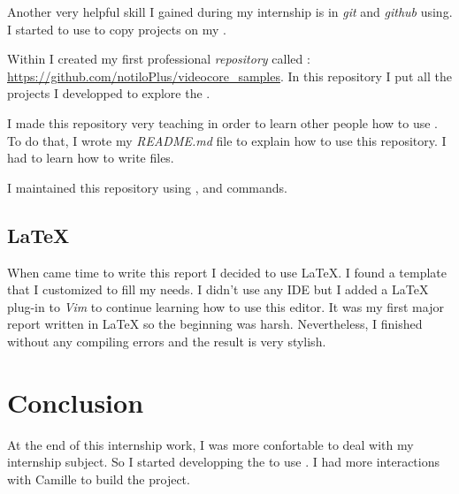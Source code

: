 Another very helpful skill I gained during my internship is in \emph{git} and \emph{github} using. I started to use  to copy projects on my \rasp.

Within \groupname{} I created my first professional \emph{repository} called : \url{https://github.com/notiloPlus/videocore_samples}. In this repository I put all the projects I developped to explore the \vc.

I made this repository very teaching in order to learn other people how to use \vc. To do that, I wrote my \emph{README.md} file to explain how to use this repository. I had to learn how to write  files.

I maintained this repository using ,  and  commands.


\subsection{\LaTeX}

When came time to write this report I decided to use \LaTeX{}. I found a template that I customized to fill my needs. I didn't use any IDE but I added a \LaTeX{} plug-in to \emph{Vim} to continue learning how to use this editor. It was my first major report written in \LaTeX{} so the beginning was harsh. Nevertheless, I finished without any compiling errors and the result is very stylish.


\section{Conclusion}\label{Conclusion2}

At the end of this internship work, I was more confortable to deal with my internship subject. So I started developping the \api{} to use \vc. I had more interactions with Camille to build the \flow{} project.
